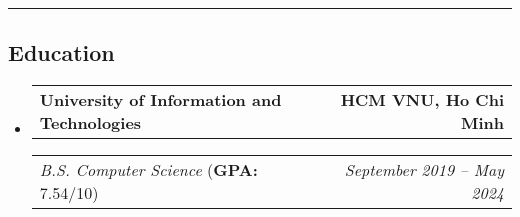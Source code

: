 \documentclass[11pt,letterpaper]{article}
\makeatletter
\newcommand{\headerrow}[2]
{\begin{tabular*}{\linewidth}{l@{\extracolsep{\fill}}r}
#1 &
#2 \\
\end{tabular*}}
\makeatother
\begin{document}
\hrule
\vspace{-1em}
\subsection*{\Large Education}

\begin{itemize}[leftmargin=1em]
    \parskip=0.1em

    \item
          \headerrow
          {\textbf{University of Information and Technologies}}
          {\textbf{HCM VNU, Ho Chi Minh}}
          \headerrow
          {\emph{B.S. Computer Science} (\textbf{GPA:} 7.54/10)}
          {\emph{September 2019 -- May 2024}}


\end{itemize}
\end{document}
